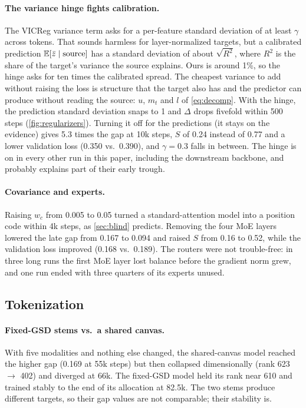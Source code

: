 \paragraph{The variance hinge fights calibration.} The VICReg variance term asks for a per-feature standard deviation of at least $\gamma$ across tokens. That sounds harmless for layer-normalized targets, but a calibrated prediction $\operatorname*{\mathbb{E}}[\bar z\mid\text{source}]$ has a standard deviation of about $\sqrt{R^2}$, where $R^2$ is the share of the target's variance the source explains. Ours is around 1\%, so the hinge asks for ten times the calibrated spread. The cheapest variance to add without raising the loss is structure that the target also has and the predictor can produce without reading the source: $u$, $m_t$ and $l$ of \cref{eq:decomp}. With the hinge, the prediction standard deviation snaps to 1 and $\Delta$ drops fivefold within 500 steps (\cref{fig:regularizers}). Turning it off for the predictions (it stays on the evidence) gives 5.3 times the gap at 10k steps, $S$ of 0.24 instead of 0.77 and a lower validation loss (0.350 vs.\ 0.390), and $\gamma{=}0.3$ falls in between. The hinge is on in every other run in this paper, including the downstream backbone, and probably explains part of their early trough.

\paragraph{Covariance and experts.} Raising $w_c$ from 0.005 to 0.05 turned a standard-attention model into a position code within 4k steps, as \cref{sec:blind} predicts. Removing the four MoE layers lowered the late gap from 0.167 to 0.094 and raised $S$ from 0.16 to 0.52, while the validation loss improved (0.168 vs.\ 0.189). The routers were not trouble-free: in three long runs the first MoE layer lost balance before the gradient norm grew, and one run ended with three quarters of its experts unused.

\subsection{Tokenization}
\label{sec:exp_tokens}

\paragraph{Fixed-GSD stems vs.\ a shared canvas.} With five modalities and nothing else changed, the shared-canvas model reached the higher gap (0.169 at 55k steps) but then collapsed dimensionally (rank 623 $\to$ 402) and diverged at 66k. The fixed-GSD model held its rank near 610 and trained stably to the end of its allocation at 82.5k. The two stems produce different targets, so their gap values are not comparable; their stability is.

